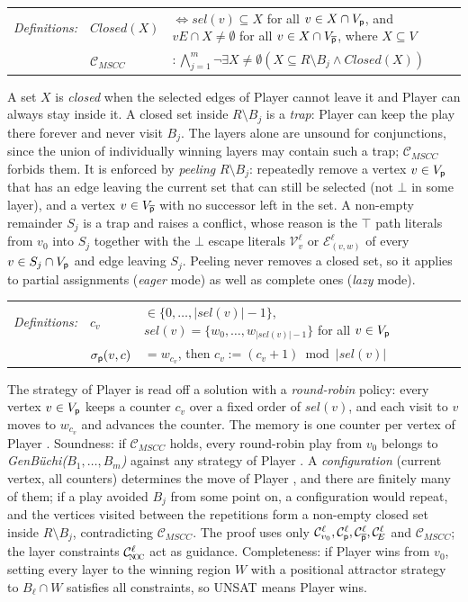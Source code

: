 \documentclass[12pt]{extarticle}
\newcommand{\definition}[1] {
    \begin{tcolorbox}[colback=mygray,colframe=mygray,sharp corners=all,top=0.01cm,bottom=0.01cm,left=0.1cm]
    \small
    \setlength{\tabcolsep}{2pt}
    \begin{tabular}{l l l l}
        \textit{Definitions:} & #1
    \end{tabular}
    \end{tcolorbox}
}
\begin{document}
\definition{
    $\textit{Closed}(X)$ &$ \iff \textit{sel}(v) \subseteq X$ for all $v \in X \cap V_{\mathsf{p}}$, and $vE \cap X \neq \emptyset$ for all $v \in X \cap V_{\overline{\mathsf{p}}}$, where $X \subseteq V$
    \\ & $\mathcal{C}_{M\!S\!C\!C}$ &$ : \bigwedge_{j=1}^{m} \neg \exists X \neq \emptyset \left(X \subseteq R \setminus B_j \wedge \textit{Closed}(X)\right)$
}
A set $X$ is \textit{closed} when the selected edges of Player \even cannot leave it and Player \odd can always stay inside it. A closed set inside $R \setminus B_j$ is a \textit{trap}: Player \odd can keep the play there forever and never visit $B_j$. The layers alone are unsound for conjunctions, since the union of individually winning layers may contain such a trap; $\mathcal{C}_{M\!S\!C\!C}$ forbids them. It is enforced by \textit{peeling} $R \setminus B_j$: repeatedly remove a vertex $v \in V_{\mathsf{p}}$ that has an edge leaving the current set that can still be selected (not $\bot$ in some layer), and a vertex $v \in V_{\overline{\mathsf{p}}}$ with no successor left in the set. A non-empty remainder $S_j$ is a trap and raises a conflict, whose reason is the $\top$ path literals from $v_0$ into $S_j$ together with the $\bot$ escape literals $\mathcal{V}^{\ell}_v$ or $\mathcal{E}^{\ell}_{(v,w)}$ of every $v \in S_j \cap V_{\mathsf{p}}$ and edge leaving $S_j$. Peeling never removes a closed set, so it applies to partial assignments (\textit{eager} mode) as well as complete ones (\textit{lazy} mode).

\definition{
    $c_v$ &$ \in \{0,\ldots,|\textit{sel}(v)|-1\}$, $\textit{sel}(v) = \{w_0,\ldots,w_{|\textit{sel}(v)|-1}\}$ for all $v \in V_{\mathsf{p}}$
    \\ & $\sigma_{\mathsf{p}}(v, c)$ &$ = w_{c_v}$, then $c_v := (c_v + 1) \bmod |\textit{sel}(v)|$
}
The strategy of Player \even is read off a solution with a \textit{round-robin} policy: every vertex $v \in V_{\mathsf{p}}$ keeps a counter $c_v$ over a fixed order of $\textit{sel}(v)$, and each visit to $v$ moves to $w_{c_v}$ and advances the counter. The memory is one counter per vertex of Player \even. Soundness: if $\mathcal{C}_{M\!S\!C\!C}$ holds, every round-robin play from $v_0$ belongs to \textit{GenB\"uchi($B_1,\ldots,B_m$)} against any strategy of Player \odd. A \textit{configuration} (current vertex, all counters) determines the move of Player \even, and there are finitely many of them; if a play avoided $B_j$ from some point on, a configuration would repeat, and the vertices visited between the repetitions form a non-empty closed set inside $R \setminus B_j$, contradicting $\mathcal{C}_{M\!S\!C\!C}$. The proof uses only $\mathcal{C}^{\ell}_{v_0}, \mathcal{C}^{\ell}_{\mathsf{p}}, \mathcal{C}^{\ell}_{\overline{\mathsf{p}}}, \mathcal{C}^{\ell}_{\!E}$ and $\mathcal{C}_{M\!S\!C\!C}$; the layer constraints $\mathcal{C}^{\ell}_{\subnoc}$ act as guidance. Completeness: if Player \even wins from $v_0$, setting every layer to the winning region $W$ with a positional attractor strategy to $B_\ell \cap W$ satisfies all constraints, so UNSAT means Player \odd wins.
\end{document}
